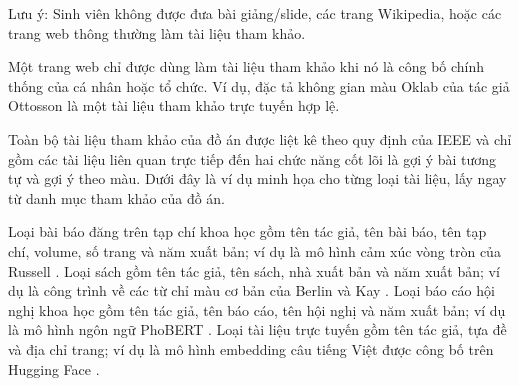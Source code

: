 \documentclass[../DoAn.tex]{subfiles}
\begin{document}
Lưu ý: Sinh viên không được đưa bài giảng/slide, các trang Wikipedia, hoặc các trang web thông thường làm tài liệu tham khảo.

Một trang web chỉ được dùng làm tài liệu tham khảo khi nó là công bố chính thống của cá nhân hoặc tổ chức. Ví dụ, đặc tả không gian màu Oklab của tác giả Ottosson \cite{ottosson2020oklab} là một tài liệu tham khảo trực tuyến hợp lệ.

Toàn bộ tài liệu tham khảo của đồ án được liệt kê theo quy định của IEEE và chỉ gồm các tài liệu liên quan trực tiếp đến hai chức năng cốt lõi là gợi ý bài tương tự và gợi ý theo màu. Dưới đây là ví dụ minh họa cho từng loại tài liệu, lấy ngay từ danh mục tham khảo của đồ án.

Loại bài báo đăng trên tạp chí khoa học gồm tên tác giả, tên bài báo, tên tạp chí, volume, số trang và năm xuất bản; ví dụ là mô hình cảm xúc vòng tròn của Russell \cite{russell1980circumplex}. Loại sách gồm tên tác giả, tên sách, nhà xuất bản và năm xuất bản; ví dụ là công trình về các từ chỉ màu cơ bản của Berlin và Kay \cite{berlin1969basic}. Loại báo cáo hội nghị khoa học gồm tên tác giả, tên báo cáo, tên hội nghị và năm xuất bản; ví dụ là mô hình ngôn ngữ PhoBERT \cite{nguyen2020phobert}. Loại tài liệu trực tuyến gồm tên tác giả, tựa đề và địa chỉ trang; ví dụ là mô hình embedding câu tiếng Việt được công bố trên Hugging Face \cite{dangvantuan2024vnembedding}.
\end{document}
